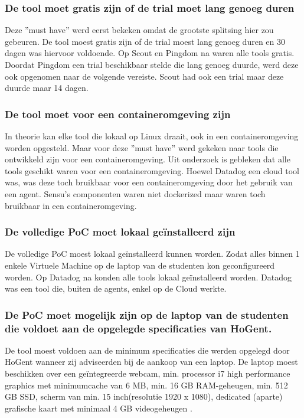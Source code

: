 \clearpage

\subsubsection{De tool moet gratis zijn of de trial moet lang genoeg duren}

Deze ''must have'' werd eerst bekeken omdat de grootste splitsing hier zou gebeuren. De tool moest gratis zijn of de trial moest lang genoeg duren en 30 dagen was hiervoor voldoende. Op Scout en Pingdom na waren alle tools gratis. Doordat Pingdom een trial beschikbaar stelde die lang genoeg duurde, werd deze ook opgenomen naar de volgende vereiste. Scout had ook een trial maar deze duurde maar 14 dagen. 

\subsubsection{De tool moet voor een containeromgeving zijn}

In theorie kan elke tool die lokaal op Linux draait, ook in een containeromgeving worden opgesteld. Maar voor deze ''must have'' werd gekeken naar tools die ontwikkeld zijn voor een containeromgeving. Uit onderzoek is gebleken dat alle tools geschikt waren voor een containeromgeving. Hoewel Datadog een cloud tool was, was deze toch bruikbaar voor een containeromgeving door het gebruik van een agent. Sensu's componenten waren niet dockerized maar waren toch bruikbaar in een containeromgeving.

\subsubsection{De volledige PoC moet lokaal geïnstalleerd zijn}

De volledige PoC moest lokaal geïnstalleerd kunnen worden. Zodat alles binnen 1 enkele Virtuele Machine op de laptop van de studenten kon geconfigureerd worden. Op Datadog na konden alle tools lokaal geïnstalleerd worden. Datadog was een tool die, buiten de agents, enkel op de Cloud werkte. 

\subsubsection{De PoC moet mogelijk zijn op de laptop van de studenten die voldoet aan de opgelegde specificaties van HoGent.}

De tool moest voldoen aan de minimum specificaties die werden opgelegd door HoGent wanneer zij adviseerden bij de aankoop van een laptop. De laptop moest beschikken over een geïntegreerde webcam, min. processor i7 high performance graphics met minimumcache van 6 MB, min. 16 GB RAM-geheugen, min. 512 GB SSD, scherm van min. 15 inch(resolutie 1920 x 1080), dedicated (aparte) grafische kaart met minimaal 4 GB videogeheugen \autocite{HoGent}.


